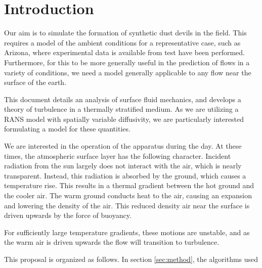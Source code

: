 \section{Introduction}

Our aim is to simulate the formation of synthetic dust devils in the field. This requires 
a model of the ambient conditions for a representative case, such as Arizona, where 
experimental data is available from test have been performed. Furthermore, for this to be 
more generally useful in the prediction of flows in a variety of conditions, we need a model 
generally applicable to any flow near the surface of the earth. 

This document details an analysis of surface fluid mechanics, and
develops a theory of turbulence in a thermally stratified medium. As we
are utilizing a RANS model with spatially variable diffusivity, we are
particularly interested formulating a model for these quantities. 

We are interested in the operation of the apparatus during the day. 
At these times, the atmospheric surface layer has the following character. 
Incident radiation from the sun largely does not interact with the
air, which is nearly transparent. Instead, this radiation is absorbed by
the ground, which causes a temperature rise. This results in a thermal
gradient between the hot ground and the cooler air. The warm ground
conducts heat to the air, causing an expansion and lowering the density
of the air. This reduced density air near the surface is driven upwards
by the force of buoyancy.  

For sufficiently large temperature gradients, these motions are
unstable, and as the warm air is driven upwards the flow will transition
to turbulence. 


This proposal is organized as follows. In section \ref{sec:method},
the algorithms used 